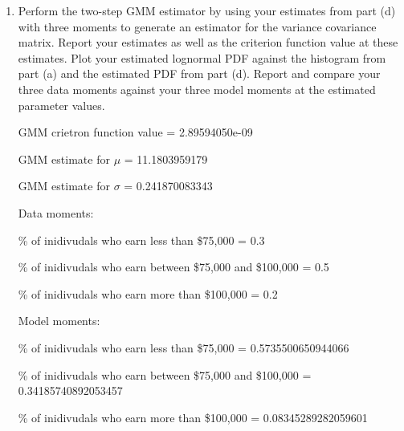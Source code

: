 \documentclass[letterpaper,12pt]{article}
\theoremstyle{definition}
\begin{document}
\begin{enumerate}
\begin{enumerate}
\item Perform the two-step GMM estimator by using your estimates from part (d) with three moments to generate an estimator for the variance covariance matrix. Report your estimates as well as the criterion function value at these estimates. Plot your estimated lognormal PDF against the histogram from part (a) and the estimated PDF from part (d). Report and compare your three data moments against your three model moments at the estimated parameter values.
\par\bigskip
\begin{figure}[H]\centering\captionsetup{width=4.0in}
\end{figure}
\par
GMM crietron function value = 2.89594050e-09\par
GMM estimate for $\mu$ = 11.1803959179 \par
GMM estimate for $\sigma$ = 0.241870083343\par
Data moments:\par
\hspace{2mm}\% of inidivudals who earn less than \$75,000 = 0.3\par
\hspace{2mm}\% of inidivudals who earn between \$75,000 and \$100,000 = 0.5\par
\hspace{2mm}\% of inidivudals who earn more than \$100,000 = 0.2\par
Model moments:\par
\hspace{2mm}\% of inidivudals who earn less than \$75,000 = 0.5735500650944066 \par
\hspace{2mm}\% of inidivudals who earn between \$75,000 and \$100,000 = 0.34185740892053457 \par
\hspace{2mm}\% of inidivudals who earn more than \$100,000 = 0.08345289282059601
\par\bigskip


\end{enumerate}
\end{enumerate}
\end{document}
